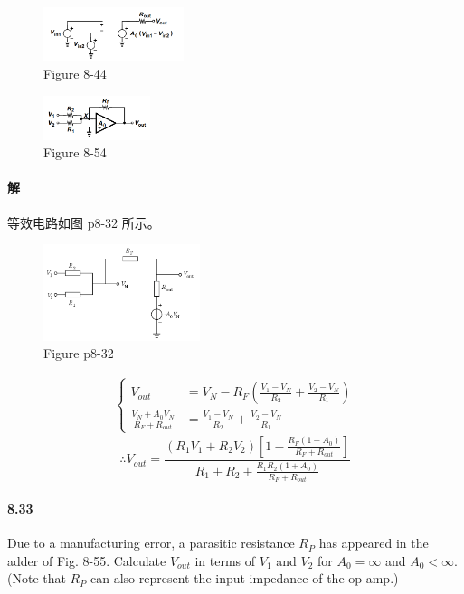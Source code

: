 \documentclass[hyperref, UTF8]{ctexart}
\begin{document}
    \begin{figure}[!htb]
        \centering
        \includegraphics[width=0.365\textwidth]{p8-44.png}
        \caption*{Figure 8-44}
    \end{figure}
    \begin{figure}[!htb]
        \centering
        \includegraphics[width=0.278\textwidth]{p8-54.png}
        \caption*{Figure 8-54}
    \end{figure}        
        
\paragraph{解}  
    等效电路如图 p8-32 所示。

    \begin{figure}[!htb]
        \centering
        \includegraphics[width=0.407\textwidth]{p8-32-sol.png}
        \caption*{Figure p8-32}
    \end{figure}

    \begin{gather*}\left\{\begin{aligned}
        V_{out} & = V_N - R_F\left(\frac{V_1-V_N}{R_2}+\frac{V_2-V_N}{R_1}\right) \\
        \frac{V_N + A_0 V_N}{R_F + R_{out}} &= \frac{V_1-V_N}{R_2}+\frac{V_2-V_N}{R_1}
    \end{aligned}\right.\end{gather*}
    $$\therefore V_{out} = \frac{(R_1V_1+R_2V_2)\left[1-\frac{R_F(1+A_0)}{R_F+R_{out}}\right]}{R_1 + R_2 + \frac{R_1R_2(1+A_0)}{R_F+R_{out}}}$$

\paragraph{8.33} \label{8.33}
    Due to a manufacturing error, a parasitic resistance $R_P$ has appeared in the adder of Fig. 8-55. Calculate $V_{out}$ in terms of $V_1$ and $V_2$ for $A_0 = \infty$ and $A_0 < \infty$. (Note that $R_P$ can also represent the input impedance of the op amp.)
\end{document}

